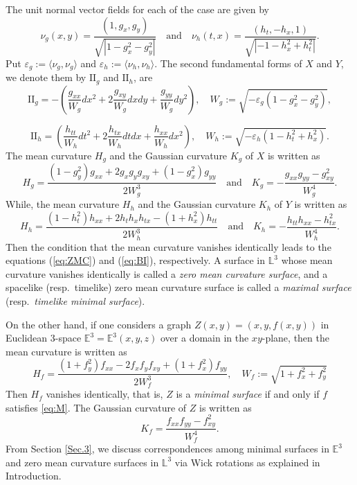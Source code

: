 \documentclass[12pt,amstex]{amsart}%
\theoremstyle{plain} %
\theoremstyle{definition}
\begin{document}
 The unit normal vector fields for each of the case are given by           
  \[ \nu_g(x,y)=\frac{(1,g_x,g_y)}{\sqrt{|1-g_x^2-g_y^2|}}\quad \text{and}\quad \nu_h(t,x)=\frac{(h_t,-h_x,1)}{\sqrt{|-1-h_x^2+h_t^2|}}.\]
Put $\varepsilon_g:=\langle \nu_g,\nu_g \rangle$ and $\varepsilon_h:=\langle \nu_h,\nu_h \rangle$. The second fundamental forms of $X$ and $Y$, we denote them by $\mathrm{II}_g$ and $\mathrm{II}_h$, are
\[
\mathrm{II}_g=-\left(\frac{g_{xx}}{W_g}dx^2+2\frac{g_{xy}}{W_g}dxdy+\frac{g_{yy}}{W_g}dy^2\right),\quad W_g:=\sqrt{-\varepsilon_g(1-g_x^2-g_y^2)},
\]

\[
\mathrm{II}_h=\left(\frac{h_{tt}}{W_h}dt^2+2\frac{h_{tx}}{W_h}dtdx+\frac{h_{xx}}{W_h}dx^2\right),\quad W_h:=\sqrt{-\varepsilon_h(1-h_t^2+h_x^2)}.
\]
The mean curvature $H_g$ and the Gaussian curvature $K_g$ of $X$ is written as
\begin{equation*}\label{eq:H_gK_g}
H_g=\frac{(1-g_y^2)g_{xx}+2g_xg_yg_{xy}+(1-g_x^2)g_{yy}}{2W_g^3}\quad \text{and}\quad K_g=-\frac{g_{xx}g_{yy}-g_{xy}^2}{W_g^4}.
\end{equation*}
While, the mean curvature $H_h$ and the Gaussian curvature $K_h$ of $Y$ is written as
\begin{equation*}\label{eq:H_hK_h}
H_h=\frac{(1-h_t^2)h_{xx}+2h_th_xh_{tx}-(1+h_x^2)h_{tt}}{2W_h^3}\quad \text{and}\quad K_h=-\frac{h_{tt}h_{xx}-h_{tx}^2}{W_h^4}.
\end{equation*}
Then the condition that the mean curvature vanishes identically leads to the equations (\ref{eq:ZMC}) and (\ref{eq:BI}), respectively. A surface in $\mathbb{L}^3$ whose mean curvature vanishes identically is called a {\it zero mean curvature surface}, and a spacelike (resp.\ timelike) zero mean curvature surface is called a {\it maximal surface} (resp.\ {\it timelike minimal surface}).

On the other hand, if one considers a graph $ Z(x,y)=(x,y,f(x,y)) $ in Euclidean 3-space $ \mathbb{E}^3=\mathbb{E}^3(x,y,z) $ over a domain in the $ xy $-plane, then the  mean curvature is written as
\[
H_f=\frac{(1+f_y^2)f_{xx}-2f_xf_yf_{xy}+(1+f_x^2)f_{yy}}{2W_f^3},\quad W_f:=\sqrt{1+f_x^2+f_y^2}
\]
Then $H_f$ vanishes identically, that is, $Z$ is a {\it minimal surface} if and only if $f$ satisfies \eqref{eq:M}.  The Gaussian curvature of $Z$ is written as
\begin{equation}\label{eq:K_f}
K_f=\frac{f_{xx}f_{yy}-f_{xy}^2}{W_f^4}.
\end{equation}
From Section \ref{Sec.3}, we discuss correspondences among minimal surfaces in $\mathbb{E}^3$ and zero mean curvature surfaces in $\mathbb{L}^3$ via Wick rotations as explained in Introduction.
\end{document}

